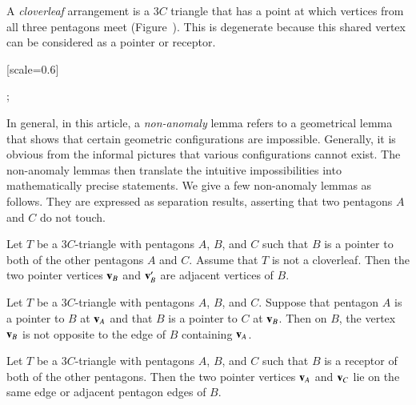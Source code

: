 


A {\it cloverleaf} arrangement is a $3C$ triangle that has a point at
which vertices from all three pentagons meet
(Figure~).  This is degenerate because this shared
vertex can be considered as a pointer or receptor.

{
[scale=0.6]
\begin{scope}[xshift=4cm]
;
\end{scope}
}

In general, in this article, a {\it non-anomaly} lemma refers to a
geometrical lemma that shows that certain geometric configurations are
impossible.  Generally, it is obvious from the informal pictures that
various configurations cannot exist.  The non-anomaly lemmas then
translate the intuitive impossibilities into mathematically precise
statements.  We give a few non-anomaly lemmas as follows.
They are expressed as separation results, asserting that
two pentagons $A$ and $C$ do not touch.

\begin{lemma} 
Let $T$ be a $3C$-triangle with pentagons $A$, $B$, and $C$ such that
$B$ is a pointer to both of the other pentagons $A$ and $C$.  
Assume that $T$ is not a cloverleaf.
Then the two pointer vertices ${\mathbf v}_B$ and ${\mathbf v}_B'$ are adjacent
vertices of $B$.
\end{lemma}

\begin{lemma}  
Let $T$ be a $3C$-triangle with pentagons $A$, $B$, and $C$.
Suppose that pentagon
$A$ is a pointer to $B$ at ${\mathbf v}_A$ and that $B$ is a pointer to $C$
at ${\mathbf v}_B$.  Then on $B$, the vertex
${\mathbf v}_B$ is not opposite to the edge of $B$ containing
${\mathbf v}_A$.
\end{lemma}

\begin{lemma} 
  Let $T$ be a $3C$-triangle with pentagons $A$, $B$, and $C$ such
  that $B$ is a receptor of both of the other pentagons.  Then the two
  pointer vertices ${\mathbf v}_A$ and ${\mathbf v}_C$ lie on the same edge or adjacent
  pentagon edges of $B$.
\end{lemma}



